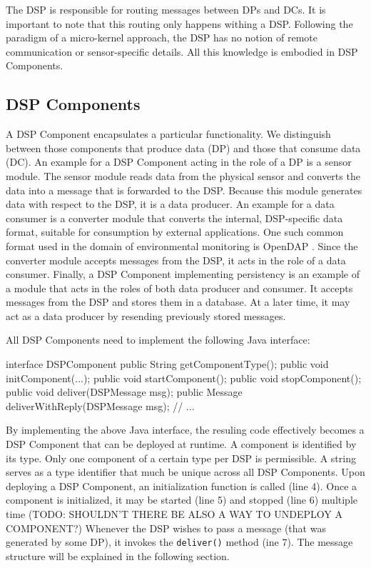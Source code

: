 \documentclass[conference]{IEEEtran}
\begin{document}
The DSP is responsible for routing messages between DPs and DCs. It is
important to note that this routing only happens withing a
DSP. Following the paradigm of a micro-kernel approach, the DSP has no
notion of remote communication or sensor-specific details. All this
knowledge is embodied in DSP Components.

\subsection{DSP Components}

A DSP Component encapsulates a particular functionality. We
distinguish between those components that produce data (DP) and those
that consume data (DC). An example for a DSP Component acting in the
role of a DP is a sensor module. The sensor module reads data from the
physical sensor and converts the data into a message that is forwarded
to the DSP. Because this module generates data with respect to the
DSP, it is a data producer. An example for a data consumer is a
converter module that converts the internal, DSP-specific data format,
suitable for consumption by external applications. One such common
format used in the domain of environmental monitoring is OpenDAP
\cite{opendap01}. Since the converter module accepts messages from the DSP, it
acts in the role of a data consumer. Finally, a DSP Component
implementing persistency is an example of a module that acts in the
roles of both data producer and consumer. It accepts messages from the
DSP and stores them in a database. At a later time, it may act as a
data producer by resending previously stored messages.

All DSP Components need to implement the following Java interface:

\begin{code}
interface DSPComponent
{
   public String getComponentType();
   public void initComponent(...);
   public void startComponent();
   public void stopComponent();
   public void deliver(DSPMessage msg);
   public Message deliverWithReply(DSPMessage msg);
   // ...
}
\end{code}

By implementing the above Java interface, the resuling code
effectively becomes a DSP Component that can be deployed at runtime. A
component is identified by its type. Only one component of a certain
type per DSP is permissible. A string serves as a type identifier that
much be unique across all DSP Components. Upon deploying a DSP
Component, an initialization function is called (line 4). Once a
component is initialized, it may be started (line 5) and stopped (line
6) multiple time (TODO: SHOULDN'T THERE BE ALSO A WAY TO UNDEPLOY A
COMPONENT?) Whenever the DSP wishes to pass a message (that was
generated by some DP), it invokes the \texttt{deliver()} method (ine
7). The message structure will be explained in the following section.
\end{document}
